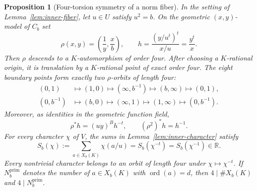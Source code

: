 \documentclass[11pt]{article}
\newtheorem{proposition}[theorem]{Proposition}
\begin{document}
\begin{proposition}[Four-torsion symmetry of a norm fiber]
\label{prop:inner-four-torsion}
In the setting of Lemma~\ref{lem:inner-fiber}, let $u\in U$ satisfy
$u^2=b$. On the geometric $(x,y)$-model of $C_b$ set
\[
 \rho(x,y)=\left(\frac1y,\frac xb\right),\qquad
 h=\frac{(y/u^t)^t}{x/u}=\frac{y^t}{x}.
\]
Then $\rho$ descends to a $K$-automorphism of order four. After
choosing a $K$-rational origin, it is translation by a $K$-rational
point of exact order four. The eight boundary points form exactly
two $\rho$-orbits of length four:
\[
 \begin{split}
 (0,1)&\longmapsto(1,0)\longmapsto(\infty,b^{-1})
     \longmapsto(b,\infty)\longmapsto(0,1),\\
 (0,b^{-1})&\longmapsto(b,0)\longmapsto(\infty,1)
     \longmapsto(1,\infty)\longmapsto(0,b^{-1}).
 \end{split}
\]
Moreover, as identities in the geometric function field,
\begin{equation}\label{eq:inner-rho-kummer}
 \rho^*h=(uy)^B h^{-t},\qquad (\rho^2)^*h=h^{-1}.
\end{equation}
For every character $\chi$ of $V$, the sums in
Lemma~\ref{lem:inner-character} satisfy
\[
 S_b(\chi):=\sum_{a\in X_b(K)}\chi(a/u)
      =S_b(\chi^{-t})=S_b(\chi^{-1})\in\mathbb R.
\]
Every nontrivial character belongs to an orbit of length four
under $\chi\mapsto\chi^{-t}$. If
$N_b^{\mathrm{prim}}$ denotes the number of $a\in X_b(K)$
with $\operatorname{ord}(a)=d$, then
$4\mid\#X_b(K)$ and $4\mid N_b^{\mathrm{prim}}$.
\end{proposition}
\end{document}

